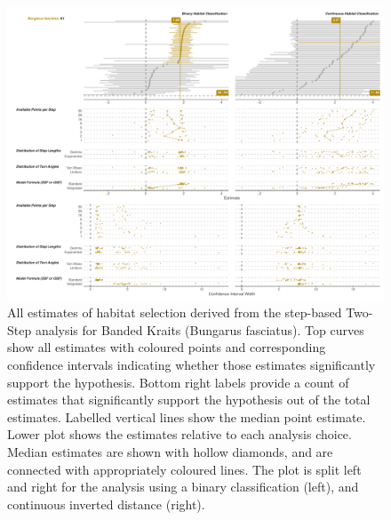\documentclass[10pt,a4paper]{article}
\begin{document}
\begin{figure}
\includegraphics[width=1\linewidth]{../../figures/specCurve_Bungarus fasciatus_twoStep} \caption{All estimates of habitat selection derived from the step-based Two-Step analysis for Banded Kraits (Bungarus fasciatus). Top curves show all estimates with coloured points and corresponding confidence intervals indicating whether those estimates significantly support the hypothesis. Bottom right labels provide a count of estimates that significantly support the hypothesis out of the total estimates. Labelled vertical lines show the median point estimate. Lower plot shows the estimates relative to each analysis choice. Median estimates are shown with hollow diamonds, and are connected with appropriately coloured lines. The plot is split left and right for the analysis using a binary classification (left), and continuous inverted distance (right).}\label{fig:specCurveTwoStepBUFA}
\end{figure}
\end{document}
